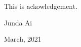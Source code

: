 \begin{thanks}

This is ackowledgement.

\vskip 18pt

\begin{flushright}

Junda Ai

March, 2021

\end{flushright}

\end{thanks}
